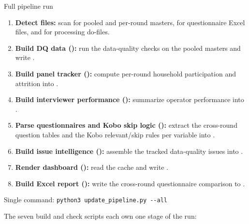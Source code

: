 \begin{procbox}{Full pipeline run}
\begin{enumerate}
  \item \textbf{Detect files:} scan  for pooled and per-round
         masters,  for questionnaire Excel
        files, and  for processing do-files.
  \item \textbf{Build DQ data ():} run the data-quality checks
        on the pooled masters and write .
  \item \textbf{Build panel tracker ():} compute per-round
        household participation and attrition into .
  \item \textbf{Build interviewer performance ():}
        summarize operator performance into .
  \item \textbf{Parse questionnaires and Kobo skip logic ():}
        extract the cross-round question tables and the Kobo relevant/skip
        rules per variable into .
  \item \textbf{Build issue intelligence ():} assemble the
        tracked data-quality issues into .
  \item \textbf{Render dashboard ():} read the cache and
        write .
  \item \textbf{Build Excel report ():} write the
        cross-round questionnaire comparison to
        .
\end{enumerate}
Single command: \verb|python3 update_pipeline.py --all|
\end{procbox}

The seven build and check scripts each own one stage of the run:

